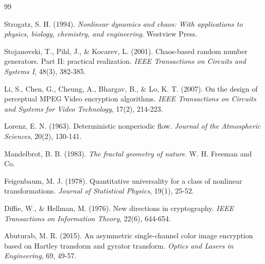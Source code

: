 \begin{thebibliography}{99}
\begin{LTRbibitems}
 Strogatz, S. H. (1994). \textit{Nonlinear dynamics and chaos: With applications to physics, biology, chemistry, and engineering}. Westview Press.
\end{LTRbibitems}

\begin{LTRbibitems}
 Stojanovski, T., Pihl, J., \& Kocarev, L. (2001). Chaos-based random number generators. Part II: practical realization. \textit{IEEE Transactions on Circuits and Systems I}, 48(3), 382-385.
\end{LTRbibitems}

\begin{LTRbibitems}
 Li, S., Chen, G., Cheung, A., Bhargav, B., \& Lo, K. T. (2007). On the design of perceptual MPEG Video encryption algorithms. \textit{IEEE Transactions on Circuits and Systems for Video Technology}, 17(2), 214-223.
\end{LTRbibitems}

\begin{LTRbibitems}
 Lorenz, E. N. (1963). Deterministic nonperiodic flow. \textit{Journal of the Atmospheric Sciences}, 20(2), 130-141.
\end{LTRbibitems}

\begin{LTRbibitems}
 Mandelbrot, B. B. (1983). \textit{The fractal geometry of nature}. W. H. Freeman and Co.
\end{LTRbibitems}

\begin{LTRbibitems}
 Feigenbaum, M. J. (1978). Quantitative universality for a class of nonlinear transformations. \textit{Journal of Statistical Physics}, 19(1), 25-52.
\end{LTRbibitems}

\begin{LTRbibitems}
 Diffie, W., \& Hellman, M. (1976). New directions in cryptography. \textit{IEEE Transactions on Information Theory}, 22(6), 644-654.
\end{LTRbibitems}

\begin{LTRbibitems}
 Abuturab, M. R. (2015). An asymmetric single-channel color image encryption based on Hartley transform and gyrator transform. \textit{Optics and Lasers in Engineering}, 69, 49-57.
\end{LTRbibitems}


\end{thebibliography}
